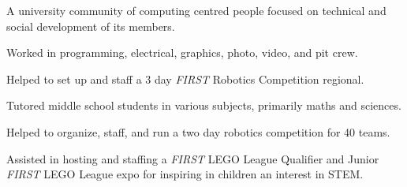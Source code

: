 
\cvtag{\LaTeX}


\medskip
{}
A university community of computing centred people focused on technical and social development of its members.

Worked in programming, electrical, graphics, photo, video, and pit crew.

Helped to set up and staff a 3 day \textit{FIRST\textsuperscript{\textregistered}} Robotics Competition regional.

Tutored middle school students in various subjects, primarily maths and sciences.

Helped to organize, staff, and run a two day robotics competition for 40 teams.

Assisted in hosting and staffing a \textit{FIRST} LEGO\textsuperscript{\textregistered} League Qualifier and Junior \textit{FIRST} LEGO League expo for inspiring in children an interest in STEM.
